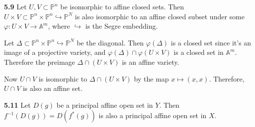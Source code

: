 \documentclass{article}
\makeatletter
\newcommand*{\shifttext}[1]{%
  \settowidth{\@tempdima}{#1}%
  \hspace{-\@tempdima}#1%
}
\newcommand{\plabel}[1]{%
\shifttext{\textbf{#1}\quad}%
}
\makeatother
\begin{document}
\plabel{5.9}%
Let $U,V\subset \mathbb{P}^n$ be isomorphic to affine closed sets.
Then $U\times V \subset \mathbb{P}^n \times \mathbb{P}^n \hookrightarrow \mathbb{P}^N$ is also isomorphic to an affine closed subset under some $\varphi\colon U\times V\to \mathbb{A}^m$, where $\hookrightarrow$ is the Segre embedding.
\par
Let $\Delta \subset \mathbb{P}^n \times \mathbb{P}^n \hookrightarrow \mathbb{P}^N$ be the diagonal.
Then $\varphi(\Delta)$ is a closed set since it's an image of a projective variety, and $\varphi(\Delta) \cap \varphi(U\times V)$ is a closed set in $\mathbb{A}^{m}$.
Therefore the preimage $\Delta \cap (U\times V)$ is an affine variety.
\par
Now $U\cap V$ is isomorphic to $\Delta \cap (U\times V)$ by the map $x\mapsto (x,x)$.
Therefore, $U\cap V$ is also an affine set.

\plabel{5.11}%
Let $D(g)$ be a principal affine open set in $Y$.
Then $f^{-1}(D(g)) = D(f^*(g))$ is also a principal affine open set in $X$.
\end{document}
